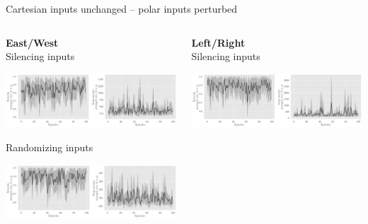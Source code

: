 \documentclass[bigger]{beamer}
\begin{document}
\begin{frame}[label={sec:org522d681}]{Cartesian inputs unchanged -- polar inputs perturbed}
\begin{columns}
\begin{column}[c]{0.5\columnwidth}
\begin{center}
\small
\textbf{East/West}\\
\footnotesize
Silencing inputs
\end{center}
\begin{center}
\includegraphics[width=\textwidth]{medias/EastWest/exp_keep-cartesian_silence-True.png}
\end{center}
\begin{center}
\footnotesize
Randomizing inputs
\end{center}
\begin{center}
\includegraphics[width=\textwidth]{medias/EastWest/exp_keep-cartesian_silence-False.png}
\end{center}
\end{column}
\begin{column}[c]{0.5\columnwidth}
\begin{center}
\small
\textbf{Left/Right}\\
\footnotesize
Silencing inputs
\end{center}
\begin{center}
\includegraphics[width=\textwidth]{medias/LeftRight/exp_keep-cartesian_silence-True.png}

\end{center}
\end{column}
\end{columns}
\end{frame}
\end{document}
